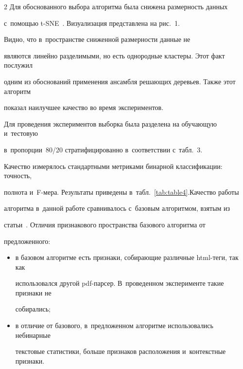 \begin{multicols}{2}
Для обоснованного выбора алгоритма была снижена раз\-мер\-ность данных 


с~по\-мощью t-SNE~\cite{Maaten}. Визуализация пред\-став\-ле\-на на рис.~1. 


Видно, что в~про\-стран\-ст\-ве сниженной раз\-мер\-ности данные не 


являются линейно разделимыми, но есть однородные клас\-те\-ры. Этот факт по\-слу\-жил 


одним из обос\-но\-ва\-ний применения ан\-самб\-ля ре\-ша\-ющих деревьев. Также этот алгоритм 


показал наилучшее качество во время экспериментов.








Для проведения экспериментов выборка была разделена на обуча\-ющую и~тес\-то\-вую 


в~пропорции~80/20 стратифицированно в~соответствии с~табл.~3. 


Качество измерялось стандартными мет\-ри\-ка\-ми бинарной классификации: точ\-ность, 


пол\-но\-та и~F-ме\-ра. Результаты приведены в~табл.~\ref{tab:table4}.\linebreak Качество работы 


алгоритма в~данной работе срав\-ни\-ва\-лось с~базовым алгоритмом, взятым из 


\mbox{статьи}~\cite{Kovacevic}. Отличия признакового про\-стран\-ст\-ва базового алгоритма от 


предложенного:


\begin{itemize}


\item


в базовом алгоритме есть признаки, со\-би\-ра\-ющие раз\-лич\-ные html-те\-ги, так как 


использовался другой pdf-пар\-сер. В~проведенном эксперименте такие признаки не 


собирались;





\item


в отличие от базового, в~предложенном алгоритме использовались небинарные 


текстовые статистики, больше признаков расположения и~кон\-текст\-ные признаки.


\end{itemize}









\end{multicols}
